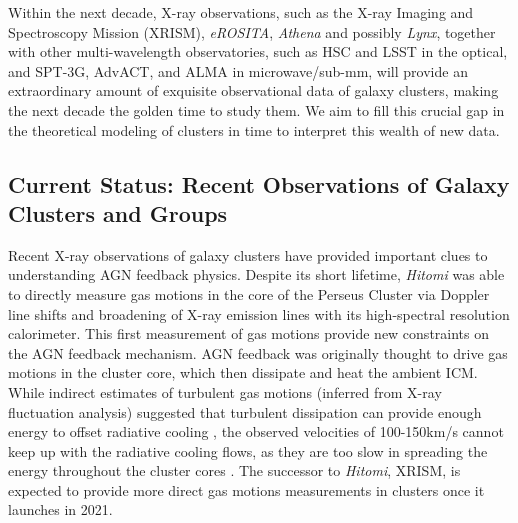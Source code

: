 \documentclass[letterpaper,11pt]{article}
\begin{document}
Within the next decade, X-ray observations, such as the X-ray Imaging and Spectroscopy Mission (XRISM), {\em eROSITA}, {\em Athena} and possibly {\em Lynx},  together with other multi-wavelength observatories, such as HSC and LSST in the optical, and SPT-3G,  AdvACT, and ALMA in microwave/sub-mm,  will provide an extraordinary amount of exquisite observational data of galaxy clusters, making the next decade the golden time to study them. We aim to fill this crucial gap in the theoretical modeling of clusters in time to interpret this wealth of new data.

\subsection{Current Status: Recent Observations of Galaxy Clusters and Groups}

Recent X-ray observations of galaxy clusters have provided important clues to understanding AGN feedback physics. Despite its short lifetime, {\em Hitomi} was able to directly measure gas motions in the core of the Perseus Cluster via Doppler line shifts and broadening of X-ray emission lines with its high-spectral resolution calorimeter.  %
This first measurement of gas motions provide new constraints on the AGN feedback mechanism.  AGN feedback was originally thought to drive gas motions in the cluster core, which then dissipate and heat the ambient ICM.  While indirect estimates of turbulent gas motions (inferred from X-ray fluctuation analysis) suggested that turbulent dissipation can provide enough energy to offset radiative cooling \citep{Zhuravleva2017}, the observed velocities of 100-150km/s cannot keep up with the radiative cooling flows, as they are too slow in spreading the energy throughout the cluster cores \citep{Fabian2017}. The successor to {\em Hitomi}, XRISM, is expected to provide more direct gas motions measurements in clusters once it launches in 2021. 
\end{document}
